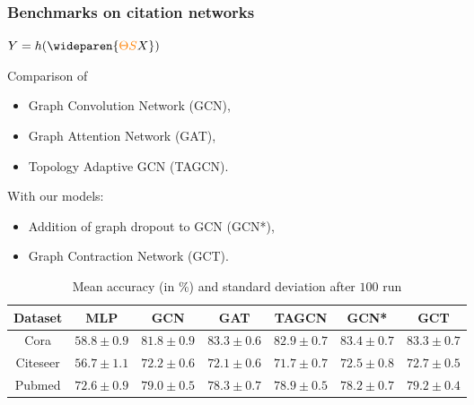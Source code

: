 \documentclass[t,9pt,pdftex]{beamer}
\theoremstyle{definition}
\begin{document}


\begin{frame}[c, label=current]
  \frametitle{Benchmarks on citation networks}
  \begin{center}{\Large $Y = h(\wideparen{\textcolor{orange}{\Theta} \textcolor{orange}{S} X})$}\\\end{center}
  Comparison of
  \begin{itemize}%
     \item Graph Convolution Network (GCN),
     \item Graph Attention Network (GAT),
     \item Topology Adaptive GCN (TAGCN).
  \end{itemize}
  With our models:
  \begin{itemize}
     \item Addition of graph dropout to GCN (GCN*),
     \item Graph Contraction Network (GCT).
\end{itemize}
\begin{small}
  \begin{table}[h]
  \begin{center}
    \bgroup
    \def\arraystretch{1.5}%
    \begin{tabular}{|c|c|c|c|c|c|c|}
    \hline
    \small{Dataset} & MLP & GCN & GAT & TAGCN & GCN* & GCT\\
    \hline
    \hline
    \small{Cora} & $58.8 \pm 0.9$ & $81.8 \pm 0.9$ & $83.3 \pm 0.6$ & $82.9 \pm 0.7$ & $\mathbf{83.4} \pm 0.7$ & $83.3 \pm 0.7$\\
    \hline
    \small{Citeseer} & $56.7 \pm 1.1$ & $72.2 \pm 0.6$ & $72.1 \pm 0.6$ & $71.7 \pm 0.7$ & $72.5 \pm 0.8$ & $\mathbf{72.7} \pm 0.5$\\
    \hline
    \small{Pubmed} & $72.6 \pm 0.9$ & $79.0 \pm 0.5$ & $78.3 \pm 0.7$ & $78.9 \pm 0.5$ & $78.2 \pm 0.7$ & $\mathbf{79.2} \pm 0.4$\\
    \hline
  \end{tabular}
    \egroup
  \end{center}
  \caption{Mean accuracy (in \%) and standard deviation after $100$ run}
  \end{table}
\end{small}
\end{frame}
\end{document}
